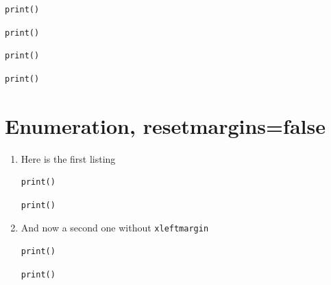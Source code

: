 \documentclass[a4paper,11pt]{article}
\makeatletter
\let\@makecaption@ORI\@makecaption
\let\lst@MakeCaption@ORI\lst@MakeCaption
\let\@makecaption@CAPTION\@makecaption
\let\lst@MakeCaption@CAPTION\lst@MakeCaption}
\newcommand\Original{\let\@makecaption\@makecaption@ORI\let\lst@MakeCaption\lst@MakeCaption@ORI}
\newcommand\Caption{\let\@makecaption\@makecaption@CAPTION\let\lst@MakeCaption\lst@MakeCaption@CAPTION}
\makeatother
\begin{document}
\begin{lstlisting}[xleftmargin=30pt,xrightmargin=10pt,caption=Some caption,captionpos=t]
print()
\end{lstlisting}

\begin{lstlisting}[xleftmargin=30pt,xrightmargin=10pt,caption=Some caption,captionpos=b]
print()
\end{lstlisting}

\captionsetup{box=colorbox,boxcolor=orange!20}

\begin{lstlisting}[xleftmargin=30pt,xrightmargin=10pt,caption=Some caption,captionpos=t]
print()
\end{lstlisting}

\begin{lstlisting}[xleftmargin=30pt,xrightmargin=10pt,caption=Some caption,captionpos=b]
print()
\end{lstlisting}

\clearpage
\section*{Enumeration, resetmargins=false}

\Original

\begin{enumerate}
\item Here is the first listing
\begin{lstlisting}[xleftmargin=30pt,resetmargins=false,caption=Some caption,captionpos=t]
print()
\end{lstlisting}
\begin{lstlisting}[xleftmargin=30pt,resetmargins=false,caption=Some caption,captionpos=b]
print()
\end{lstlisting}

\item And now a second one without \texttt{xleftmargin}
\begin{lstlisting}[xleftmargin=0pt,resetmargins=false,caption=Some caption,captionpos=t]
print()
\end{lstlisting}
\begin{lstlisting}[xleftmargin=0pt,resetmargins=false,caption=Some caption,captionpos=b]
print()
\end{lstlisting}
\end{enumerate}

\Caption\captionsetup{box=none}
\end{document}

